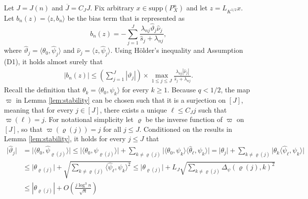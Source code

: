 \documentclass[aos]{imsart}
\renewcommand{\hat}{\widehat}
\renewcommand{\bar}{\overline}
\newcommand{\supp}{\mathrm{supp}}
\newcommand{\pd}[1]{%
	{ \color{blue} PD: #1}%
}
\theoremstyle{plain}
\theoremstyle{definition}
\theoremstyle{definition}
\begin{document}
\begin{appendix}
Let $J=J(n)$ and $\bar J=C_JJ$.
Fix arbitrary $x\in\supp(P_X^n)$ and let $z=L_{K^{1/2}}x$. Let $b_n(z)=\langle z, b_n\rangle$ be the bias term that is represented as
$$
b_n(z) = -\sum_{j=1}^J\frac{\lambda_{nj}\hat\vartheta_j\hat\nu_j}{\hat s_j+\lambda_{nj}},
$$
where $\hat\vartheta_j=\langle\theta_0,\hat\psi_j\rangle$ and $\hat\nu_j=\langle z, \hat\psi_j\rangle$. 
Using H\"{o}lder's inequality and Assumption (D1), it holds almost surely that
\begin{align}
\big|b_n(z)\big| \leq \left(\sum_{j=1}^{J}|\vartheta_j|\right)\times \max_{1\leq j\leq J}\frac{\lambda_{nj}|\hat\nu_j|}{\hat s_j+\lambda_{nj}}.
\label{eq:proof-adptr-limiting-1}
\end{align}
Recall the definition that $\theta_k=\langle\theta_0,\psi_k\rangle$ for every $k\geq 1$.
{\color{magenta}
Because $q<1/2$, the map $\varpi$ in Lemma \ref{lem:stability} can be chosen such that it is a surjection on $[J]$, meaning that for every $j\in[J]$, there exists a unique $\ell\leq C_J j$
such that $\varpi(\ell)=j$. For notational simplicity let $\varrho$ be the inverse function of $\varpi$ on $[J]$, so that $\varpi(\varrho(j))=j$ for all $j\leq J$.
Conditioned on the results in Lemma \ref{lem:stability}, it holds for every $j\leq J$ that
\begin{align}
\big|\hat\vartheta_j\big| &= \big|\langle \theta_0,\hat\psi_{\varrho(j)}\rangle\big| \leq \big|\langle \theta_0,\psi_{\varrho(j)}\rangle\big| + \sum_{k\neq \varrho(j)}\big|\langle\theta_0,\psi_k\rangle\langle\hat\theta_\ell,\psi_k\rangle\big|
=\big|\theta_j\big| + \sum_{k\neq \varrho(j)}\big|\theta_k\langle\hat\psi_\ell,\psi_k\rangle\big|\nonumber\\
&\leq \big|\theta_{\varrho(j)}\big| + \sqrt{\sum_{k\neq \varrho(j)}\langle\hat\psi_\ell,\psi_k\rangle^2} \leq \big|\theta_{\varrho(j)}\big| + L_J\sqrt{\sum_{k\neq {\varrho(j)}}\Delta_\psi(\varrho(j),k)^2}\label{eq:proof-adptr-limiting-2}\\
&\leq |\theta_{\varrho(j)}| + O\left(\frac{j\log^3 n}{\sqrt{n}}\right)\label{eq:proof-adptr-limiting-3}

\end{align}}
\end{appendix}
\end{document}
